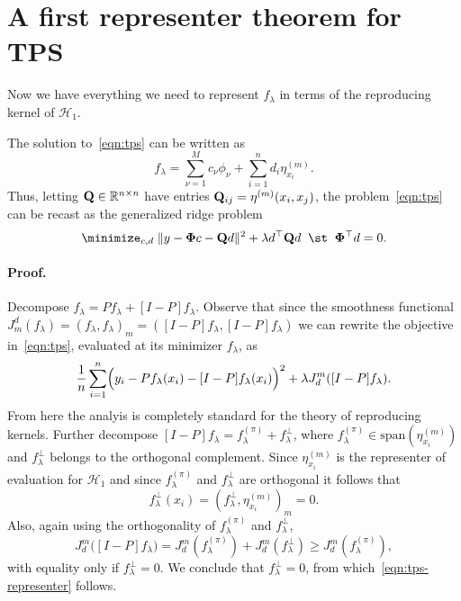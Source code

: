 \documentclass{article}
\newcommand{\mc}[1]{\mathcal{#1}}
\newcommand{\Reals}{\mathbb{R}} %
\newcommand{\1}{\mathbf{1}}
\begin{document}
\section{A first representer theorem for TPS}
Now we have everything we need to represent $f_{\lambda}$ in terms of the reproducing kernel of $\mc{H}_{1}$. 
\begin{proposition}
	\label{prop:tps-representer}
	The solution to~\eqref{eqn:tps} can be written as
	\begin{equation}
	\label{eqn:tps-representer}
	f_{\lambda} = \sum_{\nu = 1}^{M} c_{\nu} \phi_{\nu} + \sum_{i = 1}^{n} d_i \eta^{(m)}_{x_i}.
	\end{equation}
	Thus, letting ${\bf Q} \in \Reals^{n \times n}$ have entries ${\bf Q}_{ij} = \eta^{(m)}(x_i,x_j)$, the problem~\eqref{eqn:tps} can be recast as the generalized ridge problem
	\begin{equation}
	\label{eqn:generalized-ridge}
	\minimize_{c,d} \; \|y - {\bf \Phi} c - {\bf Q} d\|^2 + \lambda d^{\top} {\bf Q} d \;\; \st \;\; {\bf \Phi}^{\top}d = 0.
	\end{equation}
\end{proposition}

\paragraph{Proof.}
Decompose $f_{\lambda} = Pf_{\lambda} + [I - P]f_{\lambda}$. Observe that since the smoothness functional $J_m^d(f_{\lambda}) = (f_{\lambda},f_{\lambda})_m = ([I - P]f_{\lambda}, [I - P]f_{\lambda})$ we can rewrite the objective in~\eqref{eqn:tps}, evaluated at its minimizer $f_{\lambda}$, as
\begin{equation*}
\frac{1}{n}\sum_{i = 1}^{n}\Bigl(y_i - Pf_{\lambda}(x_i) - [I - P]f_{\lambda}(x_i)\Bigr)^2 + \lambda J_d^{m}([I - P]f_{\lambda}).
\end{equation*}
From here the analyis is completely standard for the theory of reproducing kernels. Further decompose $[I - P]f_{\lambda} = f_{\lambda}^{(\pi)} + f_{\lambda}^{\perp}$, where $f_{\lambda}^{(\pi)} \in \mathrm{span}(\eta_{x_i}^{(m)})$ and $f_{\lambda}^{\perp}$ belongs to the orthogonal complement. Since $\eta_{x_i}^{(m)}$ is the representer of evaluation for $\mc{H}_1$ and since $f_{\lambda}^{(\pi)}$ and $f_{\lambda}^{\perp}$ are orthogonal it follows that 
$$f_{\lambda}^{\perp}(x_i) = (f_{\lambda}^{\perp}, \eta_{x_i}^{(m)})_m = 0.$$ 
Also, again using the orthogonality of $f_{\lambda}^{(\pi)}$ and $f_{\lambda}^{\perp}$,
$$J_d^{m}\bigl([I - P]f_{\lambda}\bigr) = J_d^{m}(f_\lambda^{(\pi)}) + J_d^{m}(f_\lambda^{\perp}) \geq J_d^{m}(f_\lambda^{(\pi)}),$$ with equality only if $f_\lambda^{\perp} = 0$. We conclude that $f_{\lambda}^{\perp} = 0$, from which~\eqref{eqn:tps-representer} follows. 
\end{document}
